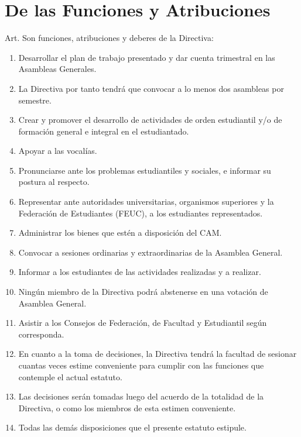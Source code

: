 \documentclass[letterpaper,11pt]{article}
\newcounter{art}
\newenvironment{art}{
    Art.\refstepcounter{art} \theart\:
}{}
\begin{document}
\section{De las Funciones y Atribuciones}\label{funcionesAtribuciones}
\begin{art}\label{funcionesDirectiva}
    Son funciones, atribuciones y deberes de la Directiva:
    \begin{enumerate}
        \item Desarrollar el plan de trabajo presentado y dar cuenta trimestral en las Asambleas Generales.
        \item La Directiva por tanto tendrá que convocar a lo menos dos asambleas por semestre.
        \item Crear y promover el desarrollo de actividades de orden estudiantil y/o de formación general e integral en el estudiantado.
        \item Apoyar a las vocalías.
        \item Pronunciarse ante los problemas estudiantiles y sociales, e informar su postura al respecto. %
        \item Representar ante autoridades universitarias, organismos superiores y la Federación de Estudiantes (FEUC), a los estudiantes representados.
        \item Administrar los bienes que estén a disposición del CAM.
        \item Convocar a sesiones ordinarias y extraordinarias de la Asamblea General. %
        \item Informar a los estudiantes de las actividades realizadas y a realizar.
        \item Ningún miembro de la Directiva podrá abstenerse en una votación de Asamblea General.
        \item Asistir a los Consejos de Federación, de Facultad y Estudiantil según corresponda.
        \item En cuanto a la toma de decisiones, la Directiva tendrá la facultad de sesionar cuantas veces estime conveniente para cumplir con las funciones que contemple el actual estatuto.
        \item Las decisiones serán tomadas luego del acuerdo de la totalidad de la Directiva, o como los miembros de esta estimen conveniente.
        \item Todas las demás disposiciones que el presente estatuto estipule.
    \end{enumerate}
\end{art}
\end{document}
